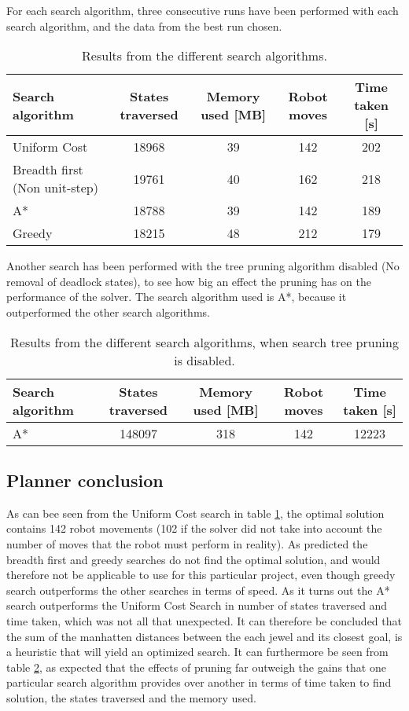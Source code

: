 For each search algorithm, three consecutive runs have been performed with each search algorithm, and the data from the best run chosen.\\

\begin{table}[h!]
	\centering
	\begin{tabular}{| l | c | c | c | c | }
		\hline
			Search algorithm	& States traversed & Memory used [MB] & Robot moves & Time taken [s]\\ \hline
	    	Uniform Cost & 18968 			& 39 		 & 142 	& 202\\\hline
		    Breadth first (Non unit-step)	& 19761 			& 40 		 & 162 	& 218\\\hline
		    A*		& 18788 			& 39 		 & 142 	& 189 \\\hline
	    	Greedy 		& 18215 			& 48 		 & 212 	& 179 \\
		\hline
	\end{tabular}
	\caption{Results from the different search algorithms.\label{tbl:searchresults}}
\end{table}
Another search has been performed with the tree pruning algorithm disabled (No removal of deadlock states), to see how big an effect the pruning has on the performance of the solver. The search algorithm used is A*, because it outperformed the other search algorithms.\\
\begin{table}[h!]
	\centering
	\begin{tabular}{| l | c | c | c | c | }
		\hline
			Search algorithm	& States traversed & Memory used [MB] & Robot moves & Time taken [s]\\ \hline
		    A*		& 148097 			& 318 		 & 142 	& 12223 \\
		\hline
	\end{tabular}
	\caption{Results from the different search algorithms, when search tree pruning is disabled.\label{tbl:searchresultsnoprun}}
\end{table}


\subsection{Planner conclusion}
As can bee seen from the Uniform Cost search in table \ref{tbl:searchresults}, the optimal solution contains 142 robot movements (102 if the solver did not take into account the number of moves that the robot must perform in reality). As predicted the breadth first and greedy searches do not find the optimal solution, and would therefore not be applicable to use for this particular project, even though greedy search outperforms the other searches in terms of speed. As it turns out the A* search outperforms the Uniform Cost Search in number of states traversed and time taken, which was not all that unexpected. It can therefore be concluded that the sum of the manhatten distances between the each jewel and its closest goal, is a heuristic that will yield an optimized search. It can furthermore be seen from table \ref{tbl:searchresultsnoprun}, as expected that the effects of pruning far outweigh the gains that one particular search algorithm provides over another in terms of time taken to find solution, the states traversed and the memory used.
